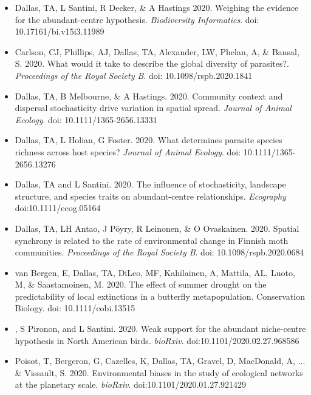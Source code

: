 \documentclass[]{CV}
\begin{document}
\begin{itemize}

\item {\mefont Dallas, TA}, L Santini, R Decker, \& A Hastings 2020. Weighing the evidence for the abundant-centre hypothesis. \textit{Biodiversity Informatics}. doi: 10.17161/bi.v15i3.11989 

\item Carlson, CJ, Phillips, AJ, {\mefont Dallas, TA}, Alexander, LW, Phelan, A, \& Bansal, S. 2020. What would it take to describe the global diversity of parasites?. \textit{Proceedings of the Royal Society B}. doi: 10.1098/rspb.2020.1841

\item {\mefont Dallas, TA}, B Melbourne, \& A Hastings. 2020. Community context and dispersal stochasticity drive variation in spatial spread. \textit{Journal of Animal Ecology}. doi: 10.1111/1365-2656.13331


\item {\mefont Dallas, TA}, L Holian, G Foster. 2020. What determines parasite species richness across host species? \textit{Journal of Animal Ecology}. doi: 10.1111/1365-2656.13276

\item {\mefont Dallas, TA} and L Santini. 2020. The influence of stochasticity, landscape structure, and species traits on abundant-centre relationships. \textit{Ecography} doi:10.1111/ecog.05164

\item {\mefont Dallas, TA}, LH Antao, J Pöyry, R Leinonen, \& O Ovaskainen. 2020. Spatial synchrony is related to the rate of environmental change in Finnish moth communities. \textit{Proceedings of the Royal Society B}. doi: 10.1098/rspb.2020.0684

\item van Bergen, E, {\mefont Dallas, TA}, DiLeo, MF, Kahilainen, A, Mattila, AL, Luoto, M, \& Saastamoinen, M. 2020. The effect of summer drought on the predictability of local extinctions in a butterfly metapopulation. Conservation Biology. doi: 10.1111/cobi.13515

\item {}, S Pironon, and L Santini. 2020. Weak support for the abundant niche-centre hypothesis in North American birds. \textit{bioRxiv}. doi:10.1101/2020.02.27.968586

\item \OA Poisot, T, Bergeron, G, Cazelles, K, {\mefont Dallas, TA}, Gravel, D, MacDonald, A, ... \& Vissault, S. 2020. Environmental biases in the study of ecological networks at the planetary scale. \textit{bioRxiv}. doi:10.1101/2020.01.27.921429

\end{itemize}
\end{document}
